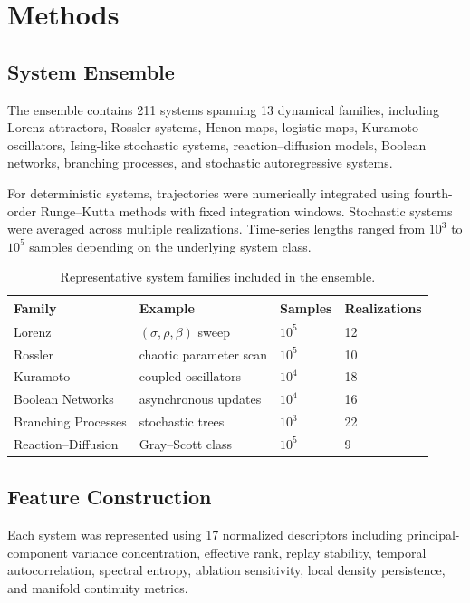 \documentclass[%
 aip,
 chaos,
 amsmath,amssymb,
 reprint,
]{revtex4-2}
\begin{document}
\section{Methods}

\subsection{System Ensemble}

The ensemble contains 211 systems spanning 13 dynamical families, including Lorenz attractors, Rossler systems, Henon maps, logistic maps, Kuramoto oscillators, Ising-like stochastic systems, reaction--diffusion models, Boolean networks, branching processes, and stochastic autoregressive systems.

For deterministic systems, trajectories were numerically integrated using fourth-order Runge--Kutta methods with fixed integration windows. Stochastic systems were averaged across multiple realizations. Time-series lengths ranged from $10^3$ to $10^5$ samples depending on the underlying system class. 

\begin{table}[t]
\caption{Representative system families included in the ensemble.}
\begin{ruledtabular}
\begin{tabular}{llll}
Family & Example & Samples & Realizations \\
\hline
Lorenz & $(\sigma,\rho,\beta)$ sweep & $10^5$ & 12 \\
Rossler & chaotic parameter scan & $10^5$ & 10 \\
Kuramoto & coupled oscillators & $10^4$ & 18 \\
Boolean Networks & asynchronous updates & $10^4$ & 16 \\
Branching Processes & stochastic trees & $10^3$ & 22 \\
Reaction--Diffusion & Gray--Scott class & $10^5$ & 9 \\
\end{tabular}
\end{ruledtabular}
\label{tab:ensemble}
\end{table}

\subsection{Feature Construction}

Each system was represented using 17 normalized descriptors including principal-component variance concentration, effective rank, replay stability, temporal autocorrelation, spectral entropy, ablation sensitivity, local density persistence, and manifold continuity metrics.
\end{document}

